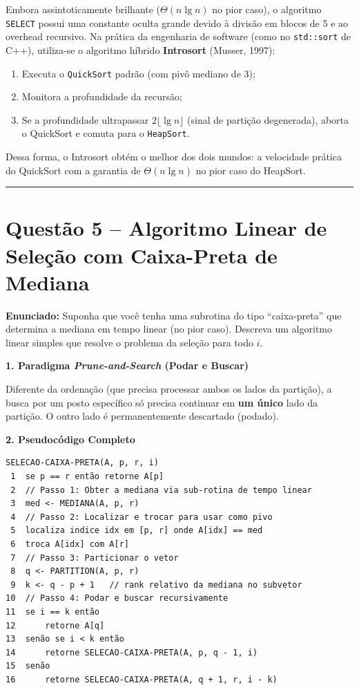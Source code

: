 \documentclass[11pt,a4paper]{article}
\newcommand{\topico}[1]{\par\medskip\textbf{\color{azul}#1}\par}
\newcommand{\questao}[2]{\section*{Questão #1 -- #2}}
\begin{document}
\begin{caixaEstudo}
Embora assintoticamente brilhante ($\Theta(n \lg n)$ no pior caso), o algoritmo \texttt{SELECT} possui uma constante oculta grande devido à divisão em blocos de 5 e ao overhead recursivo. Na prática da engenharia de software (como no \texttt{std::sort} de C++), utiliza-se o algoritmo híbrido \textbf{Introsort} (Musser, 1997):
\begin{enumerate}
    \item Executa o \texttt{QuickSort} padrão (com pivô mediano de 3);
    \item Monitora a profundidade da recursão;
    \item Se a profundidade ultrapassar $2\lfloor \lg n \rfloor$ (sinal de partição degenerada), aborta o QuickSort e comuta para o \texttt{HeapSort}.
\end{enumerate}
Dessa forma, o Introsort obtém o melhor dos dois mundos: a velocidade prática do QuickSort com a garantia de $\Theta(n \lg n)$ no pior caso do HeapSort.
\end{caixaEstudo}

\vspace{10pt}
\hrule
\vspace{6pt}

\questao{5}{Algoritmo Linear de Seleção com Caixa-Preta de Mediana}

\textbf{Enunciado:} Suponha que você tenha uma subrotina do tipo ``caixa-preta'' que determina a mediana em tempo linear (no pior caso). Descreva um algoritmo linear simples que resolve o problema da seleção para todo $i$.

\topico{1. Paradigma \textit{Prune-and-Search} (Podar e Buscar)}
Diferente da ordenação (que precisa processar ambos os lados da partição), a busca por um posto específico só precisa continuar em \textbf{um único} lado da partição. O outro lado é permanentemente descartado (podado).

\topico{2. Pseudocódigo Completo}
\begin{lstlisting}
SELECAO-CAIXA-PRETA(A, p, r, i)
 1  se p == r então retorne A[p]
 2  // Passo 1: Obter a mediana via sub-rotina de tempo linear
 3  med <- MEDIANA(A, p, r)
 4  // Passo 2: Localizar e trocar para usar como pivo
 5  localiza indice idx em [p, r] onde A[idx] == med
 6  troca A[idx] com A[r]
 7  // Passo 3: Particionar o vetor
 8  q <- PARTITION(A, p, r)
 9  k <- q - p + 1   // rank relativo da mediana no subvetor
10  // Passo 4: Podar e buscar recursivamente
11  se i == k então
12      retorne A[q]
13  senão se i < k então
14      retorne SELECAO-CAIXA-PRETA(A, p, q - 1, i)
15  senão
16      retorne SELECAO-CAIXA-PRETA(A, q + 1, r, i - k)
\end{lstlisting}
\end{document}
